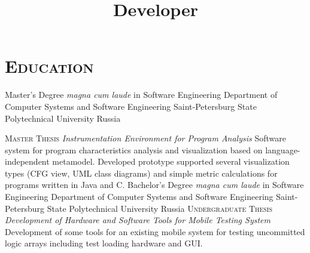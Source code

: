 \documentclass[12pt,a4paper]{moderncv}
\title     {Developer}
\begin{document}

\let\ssection\section
\renewcommand{\section}[1]{\vspace*{-2ex}\ssection{#1}}

\maketitle

\section{\textsc{Education}}
%
        {Master's Degree \textit{magna cum laude} in Software Engineering}
        {Department of Computer Systems and Software Engineering}
        {Saint-Petersburg State Polytechnical University}
        {Russia}{}

%
\cvitem{---}
       {\textsc{Master Thesis}}
       {\emph{Instrumentation Environment for Program Analysis}}
       {\small Software system for program characteristics analysis and
       visualization based on language-independent metamodel. Developed
       prototype supported several visualization types (CFG view, UML class
       diagrams) and simple metric calculations for programs written in Java and C.}
%
        {Bachelor's Degree \textit{magna cum laude} in Software Engineering}
        {Department of Computer Systems and Software Engineering}
        {Saint-Petersburg State Polytechnical University}
        {Russia}{}
%
\cvitem{---}
       {\textsc{Undergraduate Thesis}}
       {\emph{Development of Hardware and Software Tools for Mobile Testing System}
       }
       {\small Development of some tools for an existing mobile system for
       testing uncommitted logic arrays including test loading hardware and GUI. }

\end{document}
